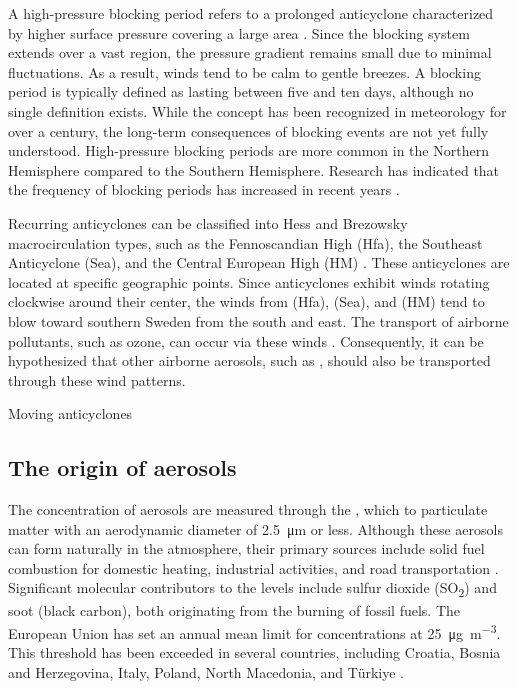 A high-pressure blocking period refers to a prolonged anticyclone characterized by higher surface pressure covering a large area \cite{lupoAtmosphericBlockingEvents2020}. Since the blocking system extends over a vast region, the pressure gradient remains small due to minimal fluctuations. As a result, winds tend to be calm to gentle breezes. A blocking period is typically defined as lasting between five and ten days, although no single definition exists. While the concept has been recognized in meteorology for over a century, the long-term consequences of blocking events are not yet fully understood. High-pressure blocking periods are more common in the Northern Hemisphere compared to the Southern Hemisphere. Research has indicated that the frequency of blocking periods has increased in recent years \cite{lupoAtmosphericBlockingEvents2020}. 

Recurring anticyclones can be classified into Hess and Brezowsky macrocirculation types, such as the Fennoscandian High (Hfa), the Southeast Anticyclone (Sea), and the Central European High (HM) \cite{bartholyEuropeanCycloneTrack2006}. These anticyclones are located at specific geographic points. Since anticyclones exhibit winds rotating clockwise around their center, the winds from (Hfa), (Sea), and (HM) tend to blow toward southern Sweden from the south and east. The transport of airborne pollutants, such as ozone, can occur via these winds \cite{oteroImpactAtmosphericBlocking2022}. Consequently, it can be hypothesized that other airborne aerosols, such as \PM, should also be transported through these wind patterns.

Moving anticyclones

\subsection{The origin of aerosols}
The concentration of aerosols are measured through the \PM, which to particulate matter with an aerodynamic diameter of \SI{2.5}{\micro\meter} or less. Although these aerosols can form naturally in the atmosphere, their primary sources include solid fuel combustion for domestic heating, industrial activities, and road transportation \cite{europeanenvironmentagencyEuropesAirQuality2024}. Significant molecular contributors to the \PM levels include sulfur dioxide (SO\textsubscript{2}) and soot (black carbon), both originating from the burning of fossil fuels. The European Union has set an annual mean limit for \PM  concentrations at \SI{25}{\micro\gram\per\cubic\meter}. This threshold has been exceeded in several countries, including Croatia, Bosnia and Herzegovina, Italy, Poland, North Macedonia, and Türkiye \cite{europeanenvironmentagencyEuropesAirQuality2024}. 

